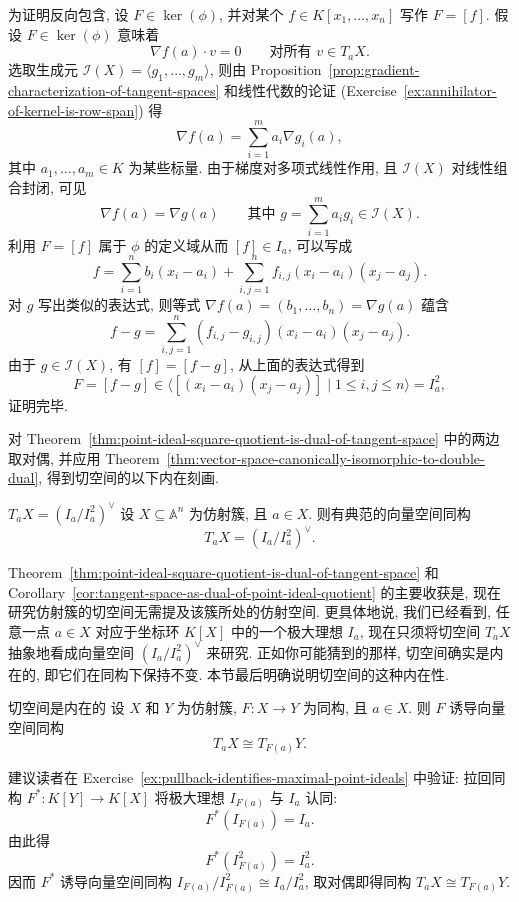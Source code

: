 \begin{Proof}
为证明反向包含, 设 $F\in\ker(\phi)$, 并对某个 $f\in K[x_{1},\ldots,x_{n}]$ 写作 $F=[f]$. 假设 $F\in\ker(\phi)$ 意味着
\[
  \nabla f(a)\cdot v=0\qquad\text{对所有 }v\in T_{a}X.
\]
选取生成元 $\mathcal{I}(X)=\langle g_{1},\ldots,g_{m}\rangle$, 则由 Proposition~\ref{prop:gradient-characterization-of-tangent-spaces} 和线性代数的论证 (Exercise~\ref{ex:annihilator-of-kernel-is-row-span}) 得
\[
  \nabla f(a)=\sum_{i=1}^{m}a_{i}\nabla g_{i}(a),
\]
其中 $a_{1},\ldots,a_{m}\in K$ 为某些标量. 由于梯度对多项式线性作用, 且 $\mathcal{I}(X)$ 对线性组合封闭, 可见
\[
  \nabla f(a)=\nabla g(a)\qquad\text{其中 }g=\sum_{i=1}^{m}a_{i}g_{i}\in\mathcal{I}(X).
\]
利用 $F=[f]$ 属于 $\phi$ 的定义域从而 $[f]\in I_{a}$, 可以写成
\[
  f=\sum_{i=1}^{n}b_{i}(x_{i}-a_{i})
    +\sum_{i,j=1}^{n}f_{i,j}(x_{i}-a_{i})(x_{j}-a_{j}).
\]
对 $g$ 写出类似的表达式, 则等式 $\nabla f(a)=(b_{1},\ldots,b_{n})=\nabla g(a)$ 蕴含
\[
  f-g=\sum_{i,j=1}^{n}(f_{i,j}-g_{i,j})(x_{i}-a_{i})(x_{j}-a_{j}).
\]
由于 $g\in\mathcal{I}(X)$, 有 $[f]=[f-g]$, 从上面的表达式得到
\[
  F=[f-g]\in\langle[(x_{i}-a_{i})(x_{j}-a_{j})]\mid1\leq i,j\leq n\rangle=I_{a}^{2},
\]
证明完毕.
\end{Proof}

对 Theorem~\ref{thm:point-ideal-square-quotient-is-dual-of-tangent-space} 中的两边取对偶, 并应用 Theorem~\ref{thm:vector-space-canonically-isomorphic-to-double-dual}, 得到切空间的以下内在刻画.

\begin{Corollary}{$T_{a}X=(I_{a}/I_{a}^{2})^{\vee}$}\leavevmode\label{cor:tangent-space-as-dual-of-point-ideal-quotient}
设 $X\subseteq\mathbb{A}^{n}$ 为仿射簇, 且 $a\in X$. 则有典范的向量空间同构
\[
  T_{a}X=(I_{a}/I_{a}^{2})^{\vee}.
\]
\end{Corollary}

Theorem~\ref{thm:point-ideal-square-quotient-is-dual-of-tangent-space} 和 Corollary~\ref{cor:tangent-space-as-dual-of-point-ideal-quotient} 的主要收获是, 现在研究仿射簇的切空间无需提及该簇所处的仿射空间. 更具体地说, 我们已经看到, 任意一点 $a\in X$ 对应于坐标环 $K[X]$ 中的一个极大理想 $I_{a}$, 现在只须将切空间 $T_{a}X$ 抽象地看成向量空间 $(I_{a}/I_{a}^{2})^{\vee}$ 来研究. 正如你可能猜到的那样, 切空间确实是内在的, 即它们在同构下保持不变. 本节最后明确说明切空间的这种内在性.

\begin{Corollary}{切空间是内在的}\leavevmode\label{cor:tangent-spaces-invariant-under-isomorphism}
设 $X$ 和 $Y$ 为仿射簇, $F:X\to Y$ 为同构, 且 $a\in X$. 则 $F$ 诱导向量空间同构
\[
  T_{a}X\cong T_{F(a)}Y.
\]
\end{Corollary}
\begin{Proof}
建议读者在 Exercise~\ref{ex:pullback-identifies-maximal-point-ideals} 中验证: 拉回同构 $F^{*}:K[Y]\to K[X]$ 将极大理想 $I_{F(a)}$ 与 $I_{a}$ 认同:
\[
  F^{*}(I_{F(a)})=I_{a}.
\]
由此得
\[
  F^{*}(I_{F(a)}^{2})=I_{a}^{2}.
\]
因而 $F^{*}$ 诱导向量空间同构 $I_{F(a)}/I_{F(a)}^{2}\cong I_{a}/I_{a}^{2}$, 取对偶即得同构 $T_{a}X\cong T_{F(a)}Y$.
\end{Proof}


